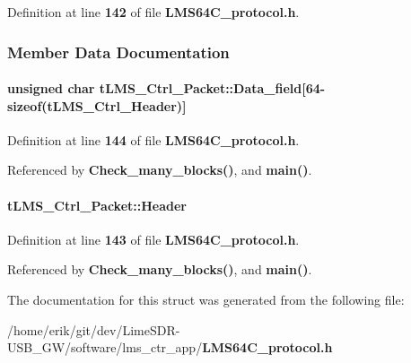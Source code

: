 Definition at line {\bf 142} of file {\bf L\+M\+S64\+C\+\_\+protocol.\+h}.



\subsubsection{Member Data Documentation}
\paragraph[{Data\+\_\+field}]{\setlength{\rightskip}{0pt plus 5cm}unsigned char t\+L\+M\+S\+\_\+\+Ctrl\+\_\+\+Packet\+::\+Data\+\_\+field[64-\/sizeof({\bf t\+L\+M\+S\+\_\+\+Ctrl\+\_\+\+Header})]}\label{structtLMS__Ctrl__Packet_aa85a412766e42afc09b1908a195b47b0}


Definition at line {\bf 144} of file {\bf L\+M\+S64\+C\+\_\+protocol.\+h}.



Referenced by {\bf Check\+\_\+many\+\_\+blocks()}, and {\bf main()}.

\paragraph[{Header}]{ t\+L\+M\+S\+\_\+\+Ctrl\+\_\+\+Packet\+::\+Header}\label{structtLMS__Ctrl__Packet_ae88c565f296c2dd5a2ec6bd4e80ea676}


Definition at line {\bf 143} of file {\bf L\+M\+S64\+C\+\_\+protocol.\+h}.



Referenced by {\bf Check\+\_\+many\+\_\+blocks()}, and {\bf main()}.



The documentation for this struct was generated from the following file\+:\begin{DoxyCompactItemize}
\item 
/home/erik/git/dev/\+Lime\+S\+D\+R-\/\+U\+S\+B\+\_\+\+G\+W/software/lms\+\_\+ctr\+\_\+app/{\bf L\+M\+S64\+C\+\_\+protocol.\+h}\end{DoxyCompactItemize}

